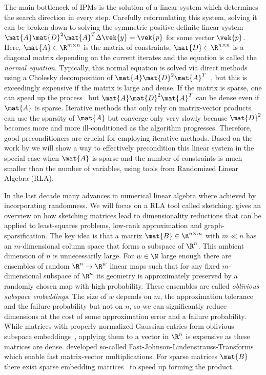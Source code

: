 The main bottleneck of IPMs is the solution of a linear system which determines the search direction in every step.
Carefully reformulating this system, solving it can be broken down to solving the symmetric positive-definite linear system \(\mat{A} \mat{D}^2 \mat{A}^T \Delta \vek{y} = \vek{p}\) for some vector \(\vek{p}\).
Here, \(\mat{A} \in \R^{m \times n}\) is the matrix of constraints, \(\mat{D} \in \R^{n \times n}\) is a diagonal matrix depending on the current iterates and the equation is called the \emph{normal equation}.
Typically, this normal equation is solved via direct methods using a Cholesky decomposition of \(\mat{A} \mat{D}^2 \mat{A}^T\)~\cite[p. 17]{Wright-PrimalDualInteriorPointMethods}, but this is exceedingly expensive if the matrix is large and dense.
If the matrix is sparse, one can speed up the process~\cite{NgPeyton-SparseCholesky} but \(\mat{A} \mat{D}^2 \mat{A}^T\) can be dense even if \(\mat{A}\) is sparse.
Iterative methods that only rely on matrix-vector products can use the sparsity of \(\mat{A}\) but converge only very slowly because \(\mat{D}^2\) becomes more and more ill-conditioned as the algorithm progresses.
Therefore, good preconditioners are crucial for employing iterative methods.
Based on the work by \textcite{Avron-FasterRandomizedInfeasibleIPMs} we will show a way to effectively precondition this linear system in the special case when \(\mat{A}\) is sparse and the number of constraints is much smaller than the number of variables, using tools from Randomized Linear Algebra (RLA).

In the last decade many advances in numerical linear algebra where achieved by incorporating randomness.
We will focus on a RLA tool called sketching.
\textcite{Woodruff-Sketching} gives an overview on how sketching matrices lead to dimensionality reductions that can be applied to least-squares problems, low-rank approximation and graph-sparsification.
The key idea is that a matrix \(\mat{B} \in \R^{n \times m}\) with \(m \ll n\) has an \(m\)-dimensional column space that forms a subspace of \(\R^n\).
This ambient dimension of \(n\) is unnecessarily large.
For \(w \in \N\) large enough there are ensembles of random \(\R^n \to \R^w\) linear maps such that for any fixed \(m\)-dimensional subspace of \(\R^n\) its geometry is approximately preserved by a randomly chosen map with high probability.
These ensembles are called \emph{oblivious subspace embeddings}.
The size of \(w\) depends on \(m\), the approximation tolerance and the failure probability but not on \(n\), so we can significantly reduce dimensions at the cost of some approximation error and a failure probability.
While matrices with properly normalized Gaussian entries form oblivious subspace embeddings~\cite[Theorem 6]{Woodruff-Sketching}, applying them to a vector in \(\R^n\) is expensive as these matrices are dense.
\textcite{AilonChazelle-FastJohnsonLindenstraussTransform} developed so-called Fast-Johnson-Lindenstrauss-Transforms which enable fast matrix-vector multiplications. For sparse matrices \(\mat{B}\) there exist sparse embedding matrices~\cite{Achlioptas-SparseSketching,Cohen-NearlyTightObliviousSubspaceEmbeddings} to speed up forming the product.

